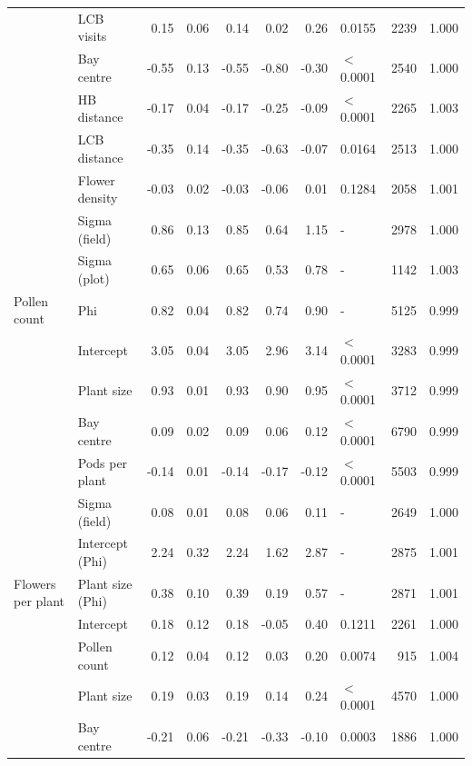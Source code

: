 \begin{longtable}{l|l|r|r|r|r|r|l|r|r}
\cline{2-10}
 & LCB visits & 0.15 & 0.06 & 0.14 & 0.02 & 0.26 & 0.0155 & 2239 & 1.000\\
\cline{2-10}
 & Bay centre & -0.55 & 0.13 & -0.55 & -0.80 & -0.30 & $<$0.0001 & 2540 & 1.000\\
\cline{2-10}
 & HB distance & -0.17 & 0.04 & -0.17 & -0.25 & -0.09 & $<$0.0001 & 2265 & 1.003\\
\cline{2-10}
 & LCB distance & -0.35 & 0.14 & -0.35 & -0.63 & -0.07 & 0.0164 & 2513 & 1.000\\
\cline{2-10}
 & Flower density & -0.03 & 0.02 & -0.03 & -0.06 & 0.01 & 0.1284 & 2058 & 1.001\\
\cline{2-10}
 & Sigma (field) & 0.86 & 0.13 & 0.85 & 0.64 & 1.15 & - & 2978 & 1.000\\
\cline{2-10}
 & Sigma (plot) & 0.65 & 0.06 & 0.65 & 0.53 & 0.78 & - & 1142 & 1.003\\
\cline{2-10}
\multirow{-10}{*}{\raggedright\arraybackslash Pollen count} & Phi & 0.82 & 0.04 & 0.82 & 0.74 & 0.90 & - & 5125 & 0.999\\
\cline{1-10}
 & Intercept & 3.05 & 0.04 & 3.05 & 2.96 & 3.14 & $<$0.0001 & 3283 & 0.999\\
\cline{2-10}
 & Plant size & 0.93 & 0.01 & 0.93 & 0.90 & 0.95 & $<$0.0001 & 3712 & 0.999\\
\cline{2-10}
 & Bay centre & 0.09 & 0.02 & 0.09 & 0.06 & 0.12 & $<$0.0001 & 6790 & 0.999\\
\cline{2-10}
 & Pods per plant & -0.14 & 0.01 & -0.14 & -0.17 & -0.12 & $<$0.0001 & 5503 & 0.999\\
\cline{2-10}
 & Sigma (field) & 0.08 & 0.01 & 0.08 & 0.06 & 0.11 & - & 2649 & 1.000\\
\cline{2-10}
 & Intercept (Phi) & 2.24 & 0.32 & 2.24 & 1.62 & 2.87 & - & 2875 & 1.001\\
\cline{2-10}
\multirow{-7}{*}{\raggedright\arraybackslash Flowers per plant} & Plant size (Phi) & 0.38 & 0.10 & 0.39 & 0.19 & 0.57 & - & 2871 & 1.001\\
\cline{1-10}
 & Intercept & 0.18 & 0.12 & 0.18 & -0.05 & 0.40 & 0.1211 & 2261 & 1.000\\
\cline{2-10}
 & Pollen count & 0.12 & 0.04 & 0.12 & 0.03 & 0.20 & 0.0074 & 915 & 1.004\\
\cline{2-10}
 & Plant size & 0.19 & 0.03 & 0.19 & 0.14 & 0.24 & $<$0.0001 & 4570 & 1.000\\
\cline{2-10}
 & Bay centre & -0.21 & 0.06 & -0.21 & -0.33 & -0.10 & 0.0003 & 1886 & 1.000\\
\cline{2-10}

\end{longtable}
